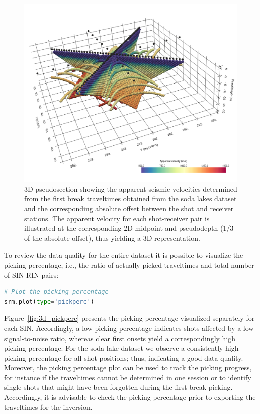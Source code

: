 \documentclass[a4paper,fleqn]{cas-sc}
\begin{document}
\begin{figure}
	\centering
	\includegraphics[width=.75\textwidth]{figures/3d_pseudosection.pdf}
	\caption{3D pseudosection showing the apparent seismic velocities determined from the first break traveltimes obtained from the soda lakes dataset and the corresponding absolute offset between the shot and receiver stations. The apparent velocity for each shot-receiver pair is illustrated at the corresponding 2D midpoint and pseudodepth (1/3 of the absolute offset), thus yielding a 3D representation.}
	\label{fig:3d_pseudosection}
\end{figure}

To review the data quality for the entire dataset it is possible to visualize the picking percentage, i.e., the ratio of actually picked traveltimes and total number of SIN-RIN pairs:
\begin{lstlisting}[language=Python, firstnumber=10]
# Plot the picking percentage
srm.plot(type='pickperc')
\end{lstlisting}
Figure~\ref{fig:3d_pickperc} presents the picking percentage visualized separately for each SIN. Accordingly, a low picking percentage indicates shots affected by a low signal-to-noise ratio, whereas clear first onsets yield a correspondingly high picking percentage. For the soda lake dataset we observe a consistently high picking percentage for all shot positions; thus, indicating a good data quality.
Moreover, the picking percentage plot can be used to track the picking progress, for instance 
if the traveltimes cannot be determined in one session or 
to identify single shots that might have been forgotten during the first break picking. Accordingly, it is advisable to check the picking percentage prior to exporting the traveltimes for the inversion.
\end{document}
